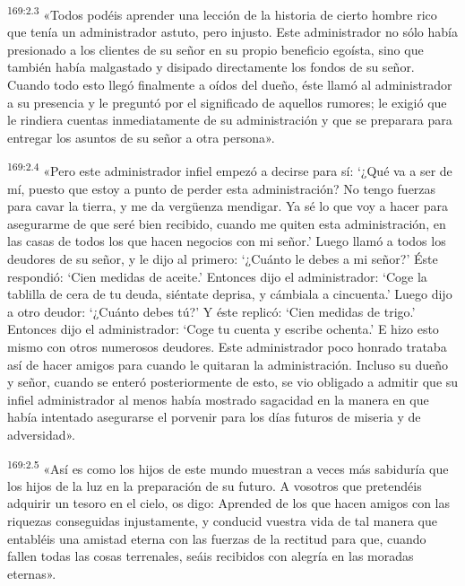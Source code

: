 \par 
\textsuperscript{169:2.3} «Todos podéis aprender una lección de la historia de cierto hombre rico que tenía un administrador astuto, pero injusto. Este administrador no sólo había presionado a los clientes de su señor en su propio beneficio egoísta, sino que también había malgastado y disipado directamente los fondos de su señor. Cuando todo esto llegó finalmente a oídos del dueño, éste llamó al administrador a su presencia y le preguntó por el significado de aquellos rumores; le exigió que le rindiera cuentas inmediatamente de su administración y que se preparara para entregar los asuntos de su señor a otra persona».

\par 
\textsuperscript{169:2.4} «Pero este administrador infiel empezó a decirse para sí: `¿Qué va a ser de mí, puesto que estoy a punto de perder esta administración? No tengo fuerzas para cavar la tierra, y me da verg\"uenza mendigar. Ya sé lo que voy a hacer para asegurarme de que seré bien recibido, cuando me quiten esta administración, en las casas de todos los que hacen negocios con mi señor.' Luego llamó a todos los deudores de su señor, y le dijo al primero: `¿Cuánto le debes a mi señor?' Éste respondió: `Cien medidas de aceite.' Entonces dijo el administrador: `Coge la tablilla de cera de tu deuda, siéntate deprisa, y cámbiala a cincuenta.' Luego dijo a otro deudor: `¿Cuánto debes tú?' Y éste replicó: `Cien medidas de trigo.' Entonces dijo el administrador: `Coge tu cuenta y escribe ochenta.' E hizo esto mismo con otros numerosos deudores. Este administrador poco honrado trataba así de hacer amigos para cuando le quitaran la administración. Incluso su dueño y señor, cuando se enteró posteriormente de esto, se vio obligado a admitir que su infiel administrador al menos había mostrado sagacidad en la manera en que había intentado asegurarse el porvenir para los días futuros de miseria y de adversidad».

\par 
\textsuperscript{169:2.5} «Así es como los hijos de este mundo muestran a veces más sabiduría que los hijos de la luz en la preparación de su futuro. A vosotros que pretendéis adquirir un tesoro en el cielo, os digo: Aprended de los que hacen amigos con las riquezas conseguidas injustamente, y conducid vuestra vida de tal manera que entabléis una amistad eterna con las fuerzas de la rectitud para que, cuando fallen todas las cosas terrenales, seáis recibidos con alegría en las moradas eternas».

